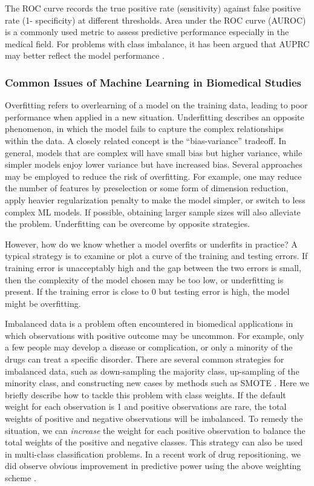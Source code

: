       The ROC curve records the true positive rate (sensitivity) against false positive rate (1- specificity) at different thresholds. Area under the ROC curve (AUROC) is a commonly used metric to assess predictive performance especially in the medical field. For problems with class imbalance, it has been argued that AUPRC may better reflect the model performance \cite{davis2006relationship}.

    \subsubsection{Common Issues of Machine Learning in Biomedical Studies}
      Overfitting refers to overlearning of a model on the training data, leading to poor performance when applied in a new situation. Underfitting describes an opposite phenomenon, in which the model fails to capture the complex relationships within the data. A closely related concept is the “bias-variance” tradeoff. In general, models that are complex will have small bias but higher variance, while simpler models enjoy lower variance but have increased bias. Several approaches may be employed to reduce the risk of overfitting. For example, one may reduce the number of features by preselection or some form of dimension reduction, apply heavier regularization penalty to make the model simpler, or switch to less complex ML models. If possible, obtaining larger sample sizes will also alleviate the problem. Underfitting can be overcome by opposite strategies. 
      
      However, how do we know whether a model overfits or underfits in practice? A typical strategy is to examine or plot a curve of the training and testing errors. If training error is unacceptably high and the gap between the two errors is small, then the complexity of the model chosen may be too low, or underfitting is present. If the training error is close to 0 but testing error is high, the model might be overfitting.

      Imbalanced data is a problem often encountered in biomedical applications in which observations with positive outcome may be uncommon. For example, only a few people may develop a disease or complication, or only a minority of the drugs can treat a specific disorder. There are several common strategies for imbalanced data, such as down-sampling the majority class, up-sampling of the minority class, and constructing new cases by methods such as SMOTE \cite{chawla2002smote}. Here we briefly describe how to tackle this problem with class weights. If the default weight for each observation is 1 and positive observations are rare, the total weights of positive and negative observations will be imbalanced. To remedy the situation, we can \textit{increase} the weight for each positive observation to balance the total weights of the positive and negative classes. This strategy can also be used in multi-class classification problems. In a recent work of drug repositioning, we did observe obvious improvement in predictive power using the above weighting scheme \cite{zhao2018drug}.

